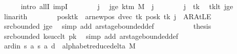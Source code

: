 \begin{isabellebody}
\ \ \ \ \isamarkupfalse%
\ {\isacharparenleft}{\kern0pt}intro\ allI\ impI{\isacharparenright}{\kern0pt}\isanewline
\ \ \ \ \ \ \isamarkupfalse%
\ j\ \isamarkupfalse%
\ jge{\isacharcolon}{\kern0pt}\ {\isachardoublequoteopen}k{\isacharunderscore}{\kern0pt}tm\ M\ {\isasymle}\ j{\isachardoublequoteclose}\isanewline
\ \ \ \ \ \ \isamarkupfalse%
\ {\isachardoublequoteopen}j\ {\isasymnoteq}\ tk{\isachardoublequoteclose}\ \isamarkupfalse%
\ tk{\isacharunderscore}{\kern0pt}lt\ jge\ \isamarkupfalse%
\ linarith\isanewline
\ \ \ \ \ \ \isamarkupfalse%
\ {\isachardoublequoteopen}{\isacharparenleft}{\kern0pt}posk{\isacharparenleft}{\kern0pt}tk\ {\isacharcolon}{\kern0pt}{\isacharequal}{\kern0pt}\ ar{\isacharunderscore}{\kern0pt}newpos\ {\isacharparenleft}{\kern0pt}dvec\ tk{\isacharparenright}{\kern0pt}\ {\isacharparenleft}{\kern0pt}posk\ tk{\isacharparenright}{\kern0pt}{\isacharparenright}{\kern0pt}{\isacharparenright}{\kern0pt}\ j\ {\isacharequal}{\kern0pt}\ AR{\isacharunderscore}{\kern0pt}AtLE{\isachardoublequoteclose}\isanewline
\ \ \ \ \ \ \ \ \isamarkupfalse%
\ src{\isacharunderscore}{\kern0pt}bounded\ jge\ \isamarkupfalse%
\ {\isacharparenleft}{\kern0pt}simp\ add{\isacharcolon}{\kern0pt}\ ar{\isacharunderscore}{\kern0pt}stage{\isacharunderscore}{\kern0pt}bounded{\isacharunderscore}{\kern0pt}def{\isacharparenright}{\kern0pt}\isanewline
\ \ \ \ \isamarkupfalse%
\isanewline
\ \ \ \ \isamarkupfalse%
\ {\isacharquery}{\kern0pt}thesis\ \isamarkupfalse%
\ src{\isacharunderscore}{\kern0pt}bounded\ ksucc{\isacharunderscore}{\kern0pt}lt\ pk\ \isamarkupfalse%
\ {\isacharparenleft}{\kern0pt}simp\ add{\isacharcolon}{\kern0pt}\ ar{\isacharunderscore}{\kern0pt}stage{\isacharunderscore}{\kern0pt}bounded{\isacharunderscore}{\kern0pt}def{\isacharparenright}{\kern0pt}\isanewline
\ \ \isamarkupfalse%
\isanewline
\ \ \isamarkupfalse%
\ ard{\isacharunderscore}{\kern0pt}in{\isacharcolon}{\kern0pt}\ {\isachardoublequoteopen}{\isacharparenleft}{\kern0pt}{\isacharquery}{\kern0pt}s{\isacharcomma}{\kern0pt}\ {\isacharquery}{\kern0pt}a{\isacharcomma}{\kern0pt}\ {\isacharquery}{\kern0pt}s{\isacharprime}{\kern0pt}{\isacharcomma}{\kern0pt}\ {\isacharquery}{\kern0pt}a{\isacharcomma}{\kern0pt}\ {\isacharquery}{\kern0pt}d{\isacharparenright}{\kern0pt}\ {\isasymin}\ alphabet{\isacharunderscore}{\kern0pt}reduce{\isacharunderscore}{\kern0pt}delta\ M{\isachardoublequoteclose}\isanewline

\end{isabellebody}
